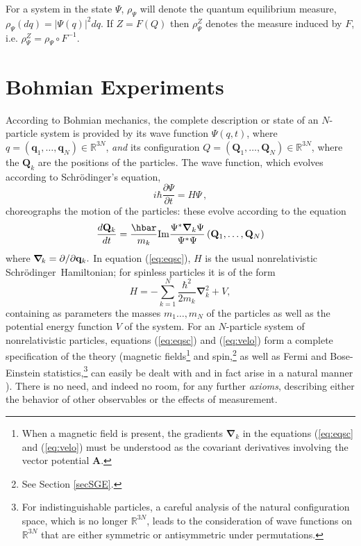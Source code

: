 \documentclass[12pt]{article}
\newcommand{\Sc}{Schr\"{o}dinger}
\newcommand{\se}{Schr\"odinger's equation}
\newcommand{\BM}{Bohmian mechanics}
\newcommand{\wf}{wave function}
\newcommand{\mybold}[1]{\mbox{\boldmath $#1$}}
\newcommand{\rvect}[2]{(#1_1,\ldots,#1_#2)}
\newcommand{\pder}[2]{\frac{\partial #1}{\partial #2}}
\newcommand{\oder}[2]{\frac{ d #1}{ d #2}}
\newcommand{\R}{\mathbb{R}}
\begin{document}
For a system in the state $\Psi$, $\rho_{\Psi}$ will denote the
quantum equilibrium measure, $\rho_{\Psi}(dq)= |\Psi(q)|^2dq$.  If
$Z=F(Q)$ then $\rho_{\Psi}^Z$ denotes the measure induced by $F$, i.e.
$\rho_{\Psi}^Z= \rho_{\Psi}\circ F^{-1}$.


\section{Bohmian Experiments}\label{sec:BE}
\setcounter{equation}{0}
\label{sec:BM}

According to \BM{}, the complete description or state of an
$N$-particle system is provided by its \wf{} $\Psi(q,t)$, where
$q=\rvect{\mathbf{q}}{N} \in \R ^{3N}$, \emph{and} its configuration
$Q= \rvect{\mathbf{Q}}{N}\in \R ^{3N}$, where the $\mathbf{Q}_k$ are
the positions of the particles.  The \wf{}, which evolves according to
\se{},
%
\begin{equation}
i\hbar\pder{\Psi}{t} = H\Psi \,,
\label{eq:eqsc}
\end{equation}
%
choreographs the motion of the particles: these evolve according to
the equation
%
\begin{equation}
\oder{\mathbf{Q}_{k}}{t} = \frac{\hbar}{m_{k}} {\rm Im}\frac{
\Psi^*\boldsymbol{\nabla}_{k}\Psi}{\Psi^*\Psi}\,
\rvect{\mathbf{Q}}{N}
\label{eq:velo}
\end{equation}
%
where $\mybold{\nabla}_{\!k}=\partial/\partial \mathbf{q}_{k}.$ In
equation (\ref{eq:eqsc}), $H$ is the usual nonrelativistic \Sc\
Hamiltonian; for spinless particles it is of the form
%
\begin{equation}
H=-{\sum}_{k=1}^{N}
\frac{{\hbar}^{2}}{2m_{k}}\boldsymbol{\nabla}^{2}_{k} + V,
\label{sh}
\end{equation}
%
containing as parameters the masses $m_1\dots, m_N$ of the particles
as well as the potential energy function $V$ of the system.  For an
$N$-particle system of nonrelativistic particles, equations
(\ref{eq:eqsc}) and (\ref{eq:velo}) form a complete specification of
the theory (magnetic fields\footnote{When a magnetic field is present,
   the gradients $\boldsymbol{\nabla}_{k}$ in the equations
   (\ref{eq:eqsc} and (\ref{eq:velo}) must be understood as the
   covariant derivatives involving the vector potential
   $\boldsymbol{A}$.  } and spin,\footnote{See Section \ref{secSGE}.}
as well as Fermi and Bose-Einstein statistics,\footnote{For
   indistinguishable particles, a careful analysis \cite{DGZ94} of the
   natural configuration space, which is no longer $\R^{3N}$, leads to
   the consideration of \wf s on $\R^{3N}$ that are either symmetric or
   antisymmetric under permutations.} can easily be dealt with and in
fact arise in a natural manner \cite{Bel66,Boh52,Nel85,Gol87,DGZ94}).
There is no need, and indeed no room, for any further \emph{axioms},
describing either the behavior of other observables or the effects of
measurement.
\end{document}
